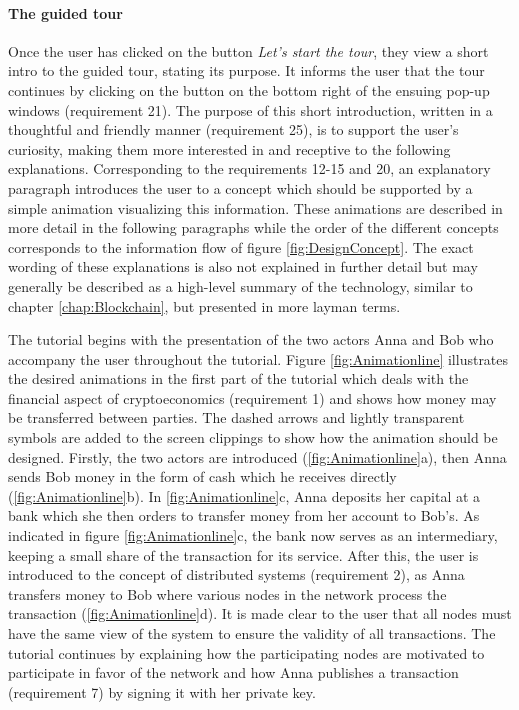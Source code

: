 \paragraph{The guided tour} Once the user has clicked on the button \textit{Let's start the tour}, they view a short intro to the guided tour, stating its purpose. It informs the user that the tour continues by clicking on the button on the bottom right of the ensuing pop-up windows (requirement 21). The purpose of this short introduction, written in a thoughtful and friendly manner (requirement 25), is to support the user's curiosity, making them more interested in and receptive to the following explanations. Corresponding to the requirements 12-15 and 20, an explanatory paragraph introduces the user to a concept which should be supported by a simple animation visualizing this information. These animations are described in more detail in the following paragraphs while the order of the different concepts corresponds to the information flow of figure \ref{fig:DesignConcept}. The exact wording of these explanations is also not explained in further detail but may generally be described as a high-level summary of the technology, similar to chapter \ref{chap:Blockchain}, but presented in more layman terms.

The tutorial begins with the presentation of the two actors Anna and Bob who accompany the user throughout the tutorial. Figure \ref{fig:Animationline} illustrates the desired animations in the first part of the tutorial which deals with the financial aspect of cryptoeconomics (requirement 1) and shows how money may be transferred between parties. The dashed arrows and lightly transparent symbols are added to the screen clippings to show how the animation should be designed. Firstly, the two actors are introduced (\ref{fig:Animationline}a), then Anna sends Bob money in the form of cash which he receives directly (\ref{fig:Animationline}b). In \ref{fig:Animationline}c, Anna deposits her capital at a bank which she then orders to transfer money from her account to Bob's. As indicated in figure \ref{fig:Animationline}c, the bank now serves as an intermediary, keeping a small share of the transaction for its service. After this, the user is introduced to the concept of distributed systems (requirement 2), as Anna transfers money to Bob where various nodes in the network process the transaction (\ref{fig:Animationline}d). It is made clear to the user that all nodes must have the same view of the system to ensure the validity of all transactions. The tutorial continues by explaining how the participating nodes are motivated to participate in favor of the network and how Anna publishes a transaction (requirement 7) by signing it with her private key.

